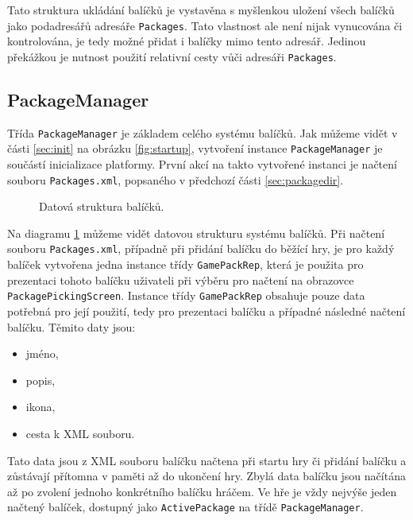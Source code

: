 Tato struktura ukládání balíčků je vystavěna s myšlenkou uložení všech balíčků jako podadresářů adresáře \texttt{Packages}. Tato vlastnost ale není nijak vynucována či kontrolována, je tedy možné přidat i balíčky mimo tento adresář. Jedinou překážkou je nutnost použití relativní cesty vůči adresáři \texttt{Packages}.

\subsection{PackageManager}
\label{sec:packagemanager}
Třída \texttt{PackageManager} je základem celého systému balíčků. Jak můžeme vidět v části \ref{sec:init} na obrázku \ref{fig:startup}, vytvoření instance \texttt{PackageManager} je součástí inicializace platformy. První akcí na takto vytvořené instanci je načtení souboru \texttt{Packages.xml}, popsaného v předchozí části \ref{sec:packagedir}.

\begin{figure}[h]
	\centering
	\fontsize{8pt}{11pt}\selectfont
	\def\svgwidth{\textwidth}
	
	\caption{Datová struktura balíčků.}
	\label{fig:packagemanager}
\end{figure}

Na diagramu \ref{fig:packagemanager} můžeme vidět datovou strukturu systému balíčků. Při načtení souboru \texttt{Packages.xml}, případně při přidání balíčku do běžící hry, je pro každý balíček vytvořena jedna instance třídy \texttt{GamePackRep}, která je použita pro prezentaci tohoto balíčku uživateli při výběru pro načtení na obrazovce \texttt{PackagePickingScreen}. Instance třídy \texttt{GamePackRep} obsahuje pouze data potřebná pro její použití, tedy pro prezentaci balíčku a případné následné načtení balíčku. Těmito daty jsou:

\begin{itemize}
	\item jméno,
	\item popis,
	\item ikona,
	\item cesta k XML souboru.
\end{itemize}

Tato data jsou z XML souboru balíčku načtena při startu hry či přidání balíčku a zůstávají přítomna v paměti až do ukončení hry. Zbylá data balíčku jsou načítána až po zvolení jednoho konkrétního balíčku hráčem. Ve hře je vždy nejvýše jeden načtený balíček, dostupný jako \texttt{ActivePackage} na třídě \texttt{PackageManager}.

